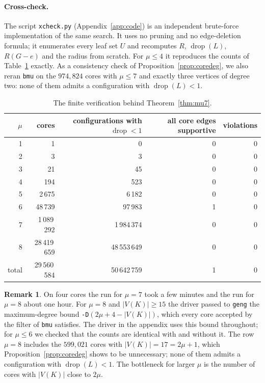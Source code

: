 \documentclass[11pt,a4paper]{article}
\theoremstyle{definition}
\newtheorem{remark}[theorem]{Remark}
\newcommand{\drop}{\operatorname{drop}}
\begin{document}
\paragraph{Cross-check.} The script \texttt{xcheck.py} (Appendix~\ref{app:code}) is an independent brute-force implementation of the same search. It uses no pruning and no edge-deletion formula; it enumerates every leaf set $U$ and recomputes $R$, $\drop(L)$, $R(G-e)$ and the radius from scratch. For $\mu\le4$ it reproduces the counts of Table~\ref{tab:mu} exactly. As a consistency check of Proposition~\ref{prop:coredeg}, we also reran \texttt{bmu} on the $974{,}824$ cores with $\mu\le7$ and exactly three vertices of degree two: none of them admits a configuration with $\drop(L)<1$.

\begin{table}[ht]
\centering
\begin{tabular}{rrrrr}
\toprule
$\mu$ & cores & configurations with $\drop<1$ & all core edges supportive & violations\\
\midrule
1 & 1 & 0 & 0 & 0\\
2 & 3 & 3 & 0 & 0\\
3 & 21 & 45 & 0 & 0\\
4 & 194 & 523 & 0 & 0\\
5 & 2\,675 & 6\,182 & 0 & 0\\
6 & 48\,739 & 97\,983 & 1 & 0\\
7 & 1\,089\,292 & 1\,984\,374 & 0 & 0\\
8 & 28\,419\,659 & 48\,553\,649 & 0 & 0\\
\midrule
total & 29\,560\,584 & 50\,642\,759 & 1 & 0\\
\bottomrule
\end{tabular}
\caption{The finite verification behind Theorem~\ref{thm:mu7}.}\label{tab:mu}
\end{table}

\begin{remark}
On four cores the run for $\mu=7$ took a few minutes and the run for $\mu=8$ about one hour. For $\mu=8$ and $|V(K)|\ge15$ the driver passed to \texttt{geng} the maximum-degree bound \texttt{-D}$(2\mu+4-|V(K)|)$, which every core accepted by the filter of \texttt{bmu} satisfies. The driver in the appendix uses this bound throughout; for $\mu\le6$ we checked that the counts are identical with and without it. The row $\mu=8$ includes the $599{,}021$ cores with $|V(K)|=17=2\mu+1$, which Proposition~\ref{prop:coredeg} shows to be unnecessary; none of them admits a configuration with $\drop(L)<1$. The bottleneck for larger $\mu$ is the number of cores with $|V(K)|$ close to $2\mu$.
\end{remark}
\end{document}
